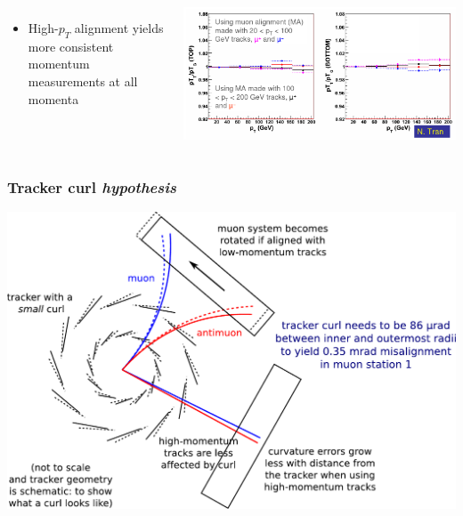 \documentclass[compress]{beamer}
\begin{document}
\begin{frame}
\begin{columns}
\begin{itemize}
\item High-$p_T$ alignment yields more consistent momentum measurements at all momenta
\end{itemize}

\hfill \includegraphics[width=0.9\linewidth]{cosmicsplitting_nhan.png}
\end{columns}
\end{frame}

\begin{frame}
\frametitle{Tracker curl {\it hypothesis}}
\includegraphics[width=\linewidth]{curl_explanation.pdf}
\end{frame}
\end{document}
